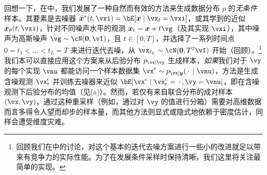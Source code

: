 \documentclass[../../book-main_zh.tex]{subfiles}
\begin{document}
回想一下，在中，我们发展了一种自然而有效的方法来生成数据分布 $p$ 的\textit{无条件}样本。其要素是去噪器 $\bar{\x}^\ast(t, \vxi) = \bE[ \x \mid \vx_t=\vxi ]$，或其学到的近似 $\bar{\x}_{\theta}(t, \vxi)$，针对不同噪声水平的观测 $\x_t = \x + t \vg$（及其实现 $\vxi$），其中噪声为高斯噪声 $\vg \sim \cN(\mathbf{0}, \vI)$，且 $t \in [0, T]$，并选择了一系列时间点 $0 = t_1 < \hdots < t_{L} = T$ 来进行迭代去噪，从 $\hat{\vx}_{t_L} \sim \cN(\mathbf{0}, T^2 \vI)$ 开始（回顾）。\footnote{回顾我们在中的讨论，对这个基本的迭代去噪方案进行一些小的改进就足以带来有竞争力的实际性能。为了在发展条件采样时保持清晰，我们这里将关注最简单的实现。}
我们本可以直接应用这个方案来从后验分布 $p_{\vx \mid \vy}$ 生成样本，\textit{如果}我们对于 $\vy$ 的每个实现 $\vnu$ 都能访问一个样本数据集 $\posteriorsample \sim p_{\vx \mid \y}(\spcdot \mid \vnu)$，方法是生成含噪观测 $\posteriorsample_t$ 并训练去噪器来近似 $\bE[ \posteriorsample \mid \posteriorsample_t=\spcdot, \vy=\vnu ]$，即在含噪观测下后验分布的均值（见(a)）。然而，若仅有来自联合分布的成对样本 $(\vx, \vy)$，通过这种重采样（例如，通过对 $\vy$ 的值进行分箱）需要对高维数据而言多得令人望而却步的样本量，而其他方法则显式或隐式地依赖于密度估计，同样会遭受维度灾难。
\end{document}
